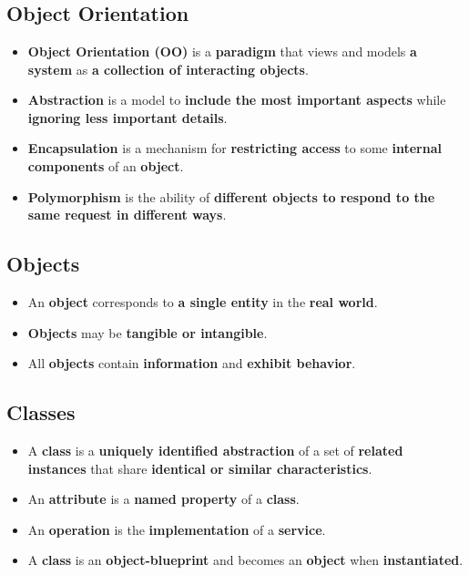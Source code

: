 \documentclass[16pt]{article}
\begin{document}
\section*{}

    \subsection*{Object Orientation}
    \begin{itemize}
        \item \textbf{Object Orientation (OO)} is a \textbf{paradigm} that views and models \textbf{a system} as \textbf{a collection of interacting objects}.
        \item \textbf{Abstraction} is a model to \textbf{include the most important aspects} while \textbf{ignoring less important details}.
        \item \textbf{Encapsulation} is a mechanism for \textbf{restricting access} to some \textbf{internal components} of an \textbf{object}.
        \item \textbf{Polymorphism} is the ability of \textbf{different objects to respond to the same request in different ways}.
    \end{itemize}

    \subsection*{Objects}
    \begin{itemize}
        \item An \textbf{object} corresponds to \textbf{a single entity} in the \textbf{real world}.
        \item \textbf{Objects} may be \textbf{tangible or intangible}.
        \item All \textbf{objects} contain \textbf{information} and \textbf{exhibit behavior}.
    \end{itemize}

    \subsection*{Classes}
    \begin{itemize}
        \item A \textbf{class} is a \textbf{uniquely identified abstraction} of a set of \textbf{related instances} that share \textbf{identical or similar characteristics}.
        \item An \textbf{attribute} is a \textbf{named property} of a \textbf{class}.
        \item An \textbf{operation} is the \textbf{implementation} of a \textbf{service}.
        \item A \textbf{class} is an \textbf{object-blueprint} and becomes an \textbf{object} when \textbf{instantiated}.
    \end{itemize}
    
\end{document}
